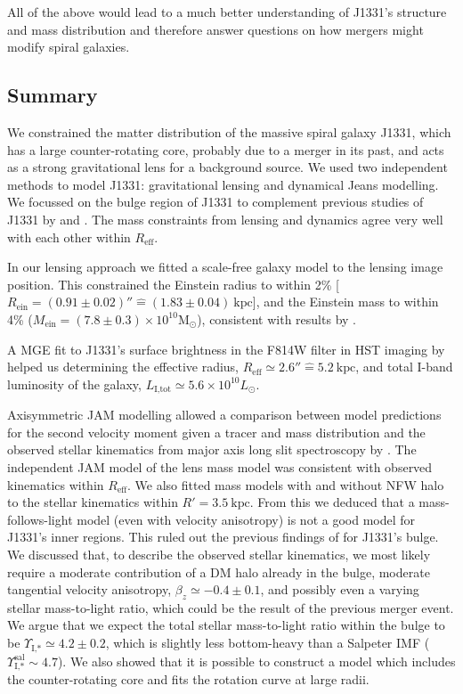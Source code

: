 \documentclass[useAMS,usenatbib]{mnras}
\begin{document}
All of the above would lead to a much better understanding of J1331's structure and mass distribution and therefore answer questions on how mergers might modify spiral galaxies.

\subsection{Summary}

We constrained the matter distribution of the massive spiral galaxy J1331, which has a large counter-rotating core, probably due to a merger in its past, and acts as a strong gravitational lens for a background source. We used two independent methods to model J1331: gravitational lensing and dynamical Jeans modelling. We focussed on the bulge region of J1331 to complement previous studies of J1331 by \citet{SWELLSIII} and \citet{SWELLSV}. The mass constraints from lensing and dynamics agree very well with each other within $R_\text{eff}$.

In our lensing approach we fitted a scale-free galaxy model to the lensing image position. This constrained the Einstein radius to within 2\% [$R_\text{ein}=(0.91\pm0.02)'' \hat{=}(1.83\pm0.04)~\text{kpc}$], and the Einstein mass to within 4\% ($M_\text{ein} = (7.8\pm0.3) \times 10^{10} \text{M}_\odot$), consistent with results by \citet{SWELLSIII}.

A MGE fit to J1331's surface brightness in the F814W filter in HST imaging by \citet{SWELLSI} helped us determining the effective radius, $R_\text{eff} \simeq 2.6'' \hat{=} 5.2~\text{kpc}$, and total I-band luminosity of the galaxy, $L_\text{I,tot} \simeq 5.6 \times 10^{10} L_\odot$.

Axisymmetric JAM modelling allowed a comparison between model predictions for the second velocity moment given a tracer and mass distribution and the observed stellar kinematics from major axis long slit spectroscopy by \citet{SWELLSV}. The independent JAM model of the lens mass model was consistent with observed kinematics within $R_\text{eff}$. We also fitted mass models with and without NFW halo to the stellar kinematics within $R'=3.5~\text{kpc}$. From this we deduced that a mass-follows-light model (even with velocity anisotropy) is not a good model for J1331's inner regions. This ruled out the previous findings of \citet{SWELLSV} for J1331's bulge. We discussed that, to describe the observed stellar kinematics, we most likely require a moderate contribution of a DM halo already in the bulge, moderate tangential velocity anisotropy, $\beta_z \simeq -0.4\pm0.1$, and possibly even a varying stellar mass-to-light ratio, which could be the result of the previous merger event. We argue that we expect the total stellar mass-to-light ratio within the bulge to be $\Upsilon_\text{I,*}\simeq 4.2\pm0.2$, which is slightly less bottom-heavy than a Salpeter IMF ($\Upsilon_\text{I,*}^\text{sal}\sim 4.7$). We also showed that it is possible to construct a model which includes the counter-rotating core and fits the rotation curve at large radii.
\end{document}
